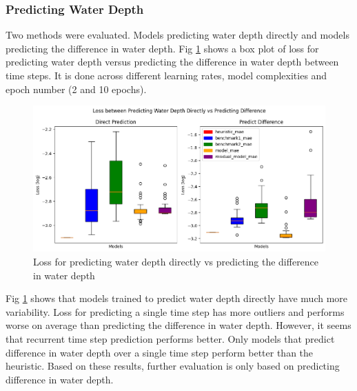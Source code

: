 \subsubsection*{Predicting Water Depth}
Two methods were evaluated. Models predicting water depth directly and models predicting the difference in water depth. Fig \ref{fig:diffvsnodiff} shows a box plot of loss for predicting water depth versus predicting the difference in water depth between time steps. It is done across different learning rates, model complexities and epoch number (2 and 10 epochs).
\begin{figure}[tbph]
	\centering
	\includegraphics[width=0.8\linewidth, height=0.3\textheight]{Figures/Results/Diff_Complexity_Lr_Epochs/Predicting_Diff/box_dif_v_no_diff}
	\caption[Predicting water depth difference vs predicting water depth directly]{Loss for predicting water depth directly vs predicting the difference in water depth}
	\label{fig:diffvsnodiff}
\end{figure}

Fig \ref{fig:diffvsnodiff} shows that models trained to predict water depth directly have much more variability. Loss  for predicting a single time step has more outliers and performs worse on average than predicting the difference in water depth. However, it seems that recurrent time step prediction performs better. Only models that predict difference in water depth over a single time step perform better than the heuristic. Based on these results, further evaluation is only based on predicting difference in water depth.

